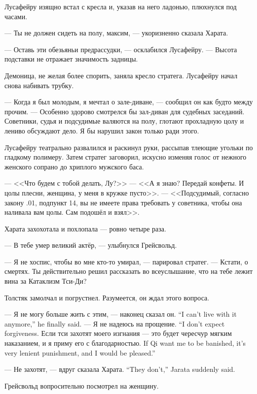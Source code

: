 Лусафейру изящно встал с кресла и, указав на него ладонью, плюхнулся под часами.

--- Ты не должен сидеть на полу, максим, --- укоризненно сказала Харата.

--- Оставь эти обезьяньи предрассудки, --- осклабился Лусафейру.
--- Высота подставки не отражает значимость задницы.

Демоница, не желая более спорить, заняла кресло стратега.
Лусафейру начал снова набивать трубку.

--- Когда я был молодым, я мечтал о зале-диване, --- сообщил он как будто между прочим.
--- Особенно здорово смотрелся бы зал-диван для судебных заседаний.
Советники, судья и подсудимые валяются на полу, глотают прохладную цолу\FM{} и лениво обсуждают дело.
Я бы нарушил закон только ради этого.

Лусафейру театрально развалился и раскинул руки, рассыпав тлеющие угольки по гладкому полимеру.
Затем стратег заговорил, искусно изменяя голос от нежного женского сопрано до хриплого мужского баса.

--- <<Что будем с тобой делать, Лу?>>
--- <<А я знаю?
Передай конфеты.
И цолы плесни, женщина, у меня в кружке пусто>>.
--- <<Подсудимый, согласно закону .01, подпункт 14, вы не имеете права требовать у советника, чтобы она наливала вам цолы.
Сам подошёл и взял>>.

Харата захохотала и похлопала --- ровно четыре раза.

--- В тебе умер великий актёр, --- улыбнулся Грейсвольд.

--- Я не хоспис, чтобы во мне кто-то умирал, --- парировал стратег.
--- Кстати, о смертях.
Ты действительно решил рассказать во всеуслышание, что на тебе лежит вина за Катаклизм Тси-Ди?

Толстяк замолчал и погрустнел.
Разумеется, он ждал этого вопроса.

{--- Я не могу больше жить с этим, --- наконец сказал он.}
{``I can't live with it anymore,'' he finally said.}
{--- Я не надеюсь на прощение.}
{``I don't expect forgiveness.}
{Если тси захотят моего изгнания --- это будет чересчур мягким наказанием, и я приму его с благодарностью.}
{If Qi want me to be banished, it's very lenient punishment, and I would be pleased.''}

{--- Не захотят, --- вдруг сказала Харата.}
{``They don't,'' Jarata suddenly said.}

Грейсвольд вопросительно посмотрел на женщину.

